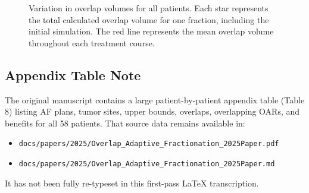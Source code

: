 \documentclass[11pt]{article}
\begin{document}
\begin{figure}[ht]
\centering
{}
\caption{Variation in overlap volumes for all patients. Each star represents the total calculated overlap volume for one fraction, including the initial simulation. The red line represents the mean overlap volume throughout each treatment course.}
\label{fig:appendix-all-overlaps}
\end{figure}

\subsection*{Appendix Table Note}

The original manuscript contains a large patient-by-patient appendix table (Table 8) listing AF plans, tumor sites, upper bounds, overlaps, overlapping OARs, and benefits for all 58 patients. That source data remains available in:
\begin{itemize}
\item \texttt{docs/papers/2025/Overlap\_Adaptive\_Fractionation\_2025Paper.pdf}
\item \texttt{docs/papers/2025/Overlap\_Adaptive\_Fractionation\_2025Paper.md}
\end{itemize}
It has not been fully re-typeset in this first-pass LaTeX transcription.
\end{document}
